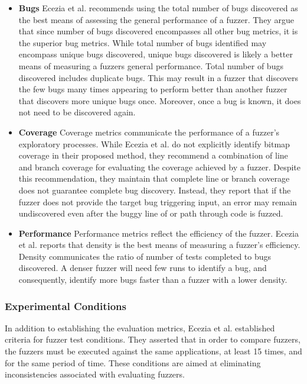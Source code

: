 \begin{itemize}
    \item \textbf{Bugs} Ecezia et al. recommends using the total number of
    bugs discovered as the best means of assessing the general performance 
    of a fuzzer. They argue that since number of bugs discovered 
    encompasses all other bug metrics, it is the superior bug metrics. 
    While total number of bugs identified may encompass unique bugs 
    discovered, unique bugs discovered is likely a better means of 
    measuring a fuzzers general performance. Total number of bugs 
    discovered includes duplicate bugs. This may result in a fuzzer that 
    discovers the few bugs many times appearing to perform better than 
    another fuzzer that discovers more unique bugs once. Moreover, once a 
    bug is known, it does not need to be discovered again.
    \item \textbf{Coverage} Coverage metrics communicate the performance 
    of a fuzzer's exploratory processes. While Ecezia et al. do not 
    explicitly identify bitmap coverage in their proposed method, they 
    recommend a combination of line and branch coverage for evaluating the 
    coverage achieved by a fuzzer. Despite this recommendation, they 
    maintain that complete line or branch coverage does not guarantee 
    complete bug discovery. Instead, they report that if the fuzzer does 
    not provide the target bug triggering input, an error may remain 
    undiscovered even after the buggy line of or path through code is 
    fuzzed. 
    \item \textbf{Performance} Performance metrics reflect the efficiency 
    of the fuzzer. Ecezia et al. reports that density is the best means of 
    measuring a fuzzer's efficiency. Density communicates the ratio of 
    number of tests completed to bugs discovered. A denser fuzzer will 
    need few runs to identify a bug, and consequently, identify more bugs 
    faster than a fuzzer with a lower density. 
\end{itemize}

\subsubsection{Experimental Conditions}
In addition to establishing the evaluation metrics, Ecezia et al. established  criteria for fuzzer 
test conditions. They asserted that in order to compare fuzzers, the fuzzers must be executed 
against the same applications, at least 15 times, and for the same period of time. These conditions 
are aimed at eliminating inconsistencies associated with evaluating fuzzers. 

